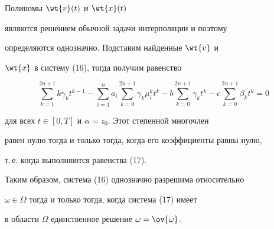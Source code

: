 \begin{pf}


Полиномы $\wt{v}(t)$ и $\wt{x}(t)$


являются решением обычной задачи интерполяции и поэтому


определяются однозначно. Подставим найденные $\wt{v}$ и


$\wt{x}$ в систему (16), тогда получим равенство


$$


\sum\limits^{2n+1}_{k=1}k\gamma_k t^{k-1} - \sum\limits^n_{i=1}


a_i \sum\limits^{2n+1}_{k=0}\gamma_k \mu^k_i t^k - b


\sum\limits^{2n+1}_{k=0}\gamma_k t^k -


c\sum\limits^{2n+1}_{k=0}\beta_k t^k =0


$$


для всех $t\in[0,T]$ и $\alpha = z_0$. Этот степенной многочлен


равен нулю тогда и только тогда, когда его коэффициенты равны нулю,


т.\,е. когда выполняются равенства (17).


Таким образом, система (16) однозначно разрешима относительно


$\omega\in\Omega$ тогда и только тогда, когда система (17) имеет


в области $\Omega$ единственное решение $\omega=\ov{\omega}$.


\end{pf}





